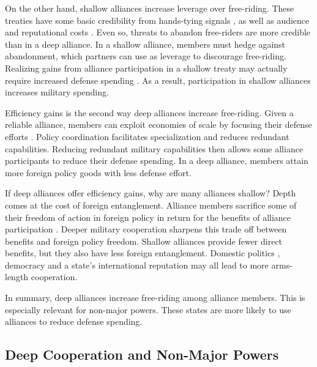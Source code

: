 \documentclass[12pt]{article}
\begin{document}
On the other hand, shallow alliances increase leverage over free-riding. 
These treaties have some basic credibility from hands-tying signals \citep{Fearon1997}, as well as audience \cite{Morrow2000} and reputational costs \citep{Gibler2008, Crescenzietal2012}.
Even so, threats to abandon free-riders are more credible than in a deep alliance.  
In a shallow alliance, members must hedge against abandonment, which partners can use as leverage to discourage free-riding. 
Realizing gains from alliance participation in a shallow treaty may actually require increased defense spending \citep{NiouZeigler2019}.
As a result, participation in shallow alliances increases military spending. 


Efficiency gains is the second way deep alliances increase free-riding. 
Given a reliable alliance, members can exploit economies of scale by focusing their defense efforts \citep{Leeds2003a}. 
Policy coordination facilitates specialization and reduces redundant capabilities. 
Reducing redundant military capabilities then allows some alliance participants to reduce their defense spending. 
In a deep alliance, members attain more foreign policy goods with less defense effort. 


If deep alliances offer efficiency gains, why are many alliances shallow? 
Depth comes at the cost of foreign entanglement. 
Alliance members sacrifice some of their freedom of action in foreign policy in return for the benefits of alliance participation \citep{Altfield1984, Snyder1997}.
Deeper military cooperation sharpens this trade off between benefits and foreign policy freedom. 
Shallow alliances provide fewer direct benefits, but they also have less foreign entanglement.
Domestic politics \citep{Davis2004}, democracy \citep{Chibaetal2015} and a state's international reputation \citep{Mattes2012} may all lead to more arms-length cooperation. 



In summary, deep alliances increase free-riding among alliance members. 
This is especially relevant for non-major powers.
These states are more likely to use alliances to reduce defense spending. 


\subsection{Deep Cooperation and Non-Major Powers} 
\end{document}
